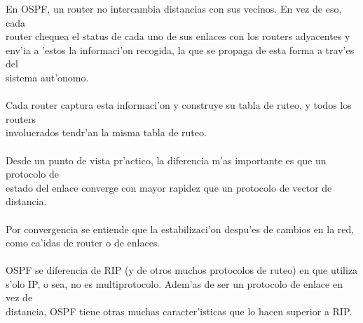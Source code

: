 \documentclass[xcolor=dvipsnames]{beamer}
\begin{document}
	\begin{frame}{}
	\scriptsize
	{
	\begin{tabbing}	
	En OSPF, un router no intercambia distancias con sus vecinos. En vez de eso, cada \\
	router chequea el status de cada uno de sus enlaces con los routers adyacentes y \\
	env'{i}a a 'estos la informaci'on recogida, la que se propaga de esta forma a trav'es del \\
	sistema aut'onomo. \\ \\
	Cada router captura esta informaci'on y construye su tabla de ruteo, y todos los routers \\
	involucrados tendr'an la misma tabla de ruteo. \\ \\
	Desde un punto de vista pr'actico, la diferencia m'as importante es que un protocolo de \\
	estado del enlace converge con mayor rapidez que un protocolo de vector de distancia.\\ \\
	Por convergencia se entiende que la estabilizaci'on despu'es de cambios en la red, \\
	como ca'{i}das de router o de enlaces.\\ \\
	OSPF se diferencia de RIP (y de otros muchos protocolos de ruteo) en que utiliza\\
	s'olo IP, o sea, no es multiprotocolo. Adem'as de ser un protocolo de enlace en vez de \\
	distancia, OSPF tiene otras muchas caracter'{i}sticas que lo hacen superior a RIP.\\
		 
	\end{tabbing}
	}
	\end{frame}
\end{document}
